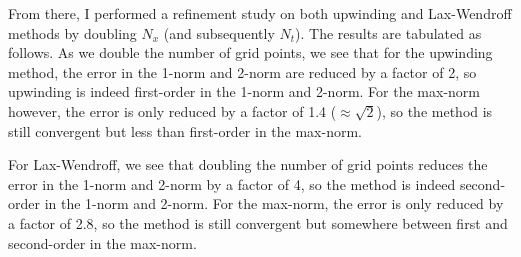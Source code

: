 \documentclass[12pt]{article}
\begin{document}
\begin{enumerate}[(a)]
From there, I performed a refinement study on both upwinding and Lax-Wendroff methods by doubling $N_x$ (and subsequently $N_t$).  The results are tabulated as follows. As we double the number of grid points, we see that for the upwinding method, the error in the 1-norm and 2-norm are reduced by a factor of 2, so upwinding is indeed first-order in the 1-norm and 2-norm.  For the max-norm however, the error is only reduced by a factor of 1.4 ($\approx \sqrt{2}$), so the method is still convergent but less than first-order in the max-norm.

For Lax-Wendroff, we see that doubling the number of grid points reduces the error in the 1-norm and 2-norm by a factor of 4, so the method is indeed second-order in the 1-norm and 2-norm.  For the max-norm, the error is only reduced by a factor of 2.8, so the method is still convergent but somewhere between first and second-order in the max-norm.


\end{enumerate}
\end{document}
